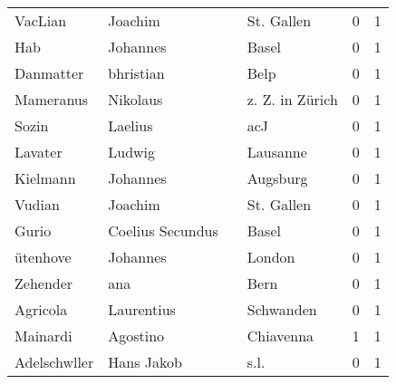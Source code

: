 \begin{tabular}{llllrr}
                  VacLian &                            Joachim &             &                                  St. Gallen &          0 &         1 \\
                      Hab &                           Johannes &             &                                       Basel &          0 &         1 \\
                Danmatter &                          bhristian &             &                                        Belp &          0 &         1 \\
                Mameranus &                           Nikolaus &             &                             z. Z. in Zürich &          0 &         1 \\
                    Sozin &                            Laelius &             &                                         acJ &          0 &         1 \\
                  Lavater &                             Ludwig &             &                                    Lausanne &          0 &         1 \\
                 Kielmann &                           Johannes &             &                                    Augsburg &          0 &         1 \\
                   Vudian &                            Joachim &             &                                  St. Gallen &          0 &         1 \\
                    Gurio &                   Coelius Secundus &             &                                       Basel &          0 &         1 \\
                 ütenhove &                           Johannes &             &                                      London &          0 &         1 \\
                 Zehender &                                ana &             &                                        Bern &          0 &         1 \\
                 Agricola &                         Laurentius &             &                                   Schwanden &          0 &         1 \\
                 Mainardi &                           Agostino &             &                                   Chiavenna &          1 &         1 \\
             Adelschwller &                         Hans Jakob &             &                                        s.l. &          0 &         1 \\

\end{tabular}
